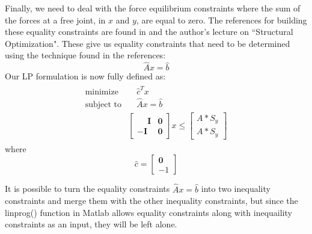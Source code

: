 \documentclass[12pt]{article}
\newcommand{\bm}[1]{\boldsymbol{#1}}
\begin{document}
Finally, we need to deal with the force equilibrium constraints where the sum of the forces at a free joint, in $x$ and $y$, are equal to zero.  The references for building these equality constraints are found in \cite{236A} and the author's lecture on ``Structural Optimization".  These give us equality constraints that need to be determined using the technique found in the references:
\begin{equation}
\hat{A}x=\hat{b}
\end{equation}
Our LP formulation is now fully defined as:
\begin{eqnarray}
\begin{array}{ll}
\mbox{minimize} &\quad \hat{c}^Tx\\
\mbox{subject to} & \quad \hat{A}x=\hat{b}\\
&\left[
\begin{array}{cc}
\phantom{-}\bm{I} & \bm{0}\\
-\bm{I} & \bm{0}
\end{array}
\right]
x \leq 
\left[
\begin{array}{c}
A*S_y\\
A*S_y
\end{array}
\right]
\end{array}
\label{eqn:LP}
\end{eqnarray}
where
\begin{equation}
\hat{c} =
\left[
\begin{array}{r}
\bm{0}\\
-1
\end{array}
\right]
\end{equation}

It is possible to turn the equality constraints $\hat{A}x=\hat{b}$ into two inequality constraints and merge them with the other inequality constraints, but since the linprog() function in Matlab allows equality constraints along with inequaility constraints as an input, they will be left alone. 
\end{document}
